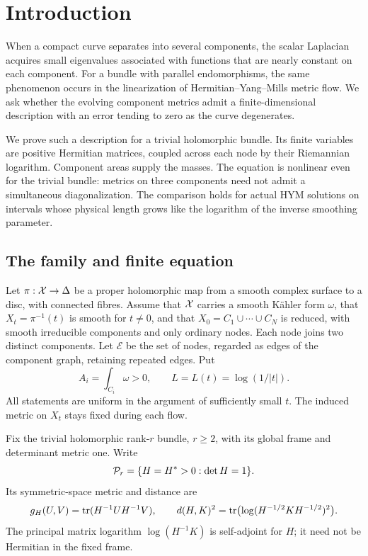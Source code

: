 \section{Introduction}\label{sec:intro}

When a compact curve separates into several components, the scalar
Laplacian acquires small eigenvalues associated with functions that are
nearly constant on each component. For a bundle with parallel
endomorphisms, the same phenomenon occurs in the linearization of
Hermitian--Yang--Mills metric flow. We ask whether the evolving component
metrics admit a finite-dimensional description with an error tending to
zero as the curve degenerates.

We prove such a description for a trivial holomorphic bundle. Its finite
variables are positive Hermitian matrices, coupled across each node by
their Riemannian logarithm. Component areas supply the masses. The
equation is nonlinear even for the trivial bundle: metrics on three
components need not admit a simultaneous diagonalization. The comparison
holds for actual HYM solutions on intervals whose physical length grows
like the logarithm of the inverse smoothing parameter.

\subsection{The family and finite equation}
Let $\pi:\mathcal X\to\Delta$ be a proper holomorphic map from a smooth complex
surface to a disc, with connected fibres. Assume that $\mathcal X$ carries a
smooth K\"ahler form $\omega$, that $X_t=\pi^{-1}(t)$ is smooth for
$t\ne0$, and that $X_0=C_1\cup\cdots\cup C_N$ is reduced, with smooth
irreducible components and only ordinary nodes. Each node joins two
distinct components. Let $\mathcal E$ be the set of nodes, regarded as
edges of the component graph, retaining repeated edges. Put
\[
 A_i=\int_{C_i}\omega>0,\qquad L=L(t)=\log(1/|t|).
\]
All statements are uniform in the argument of sufficiently small $t$.
The induced metric on $X_t$ stays fixed during each flow.

Fix the trivial holomorphic rank-$r$ bundle, $r\ge2$, with its global
frame and determinant metric one. Write
\[
 \mathcal P_r=\{H=H^*>0:\det H=1\}.
\]
Its symmetric-space metric and distance are
\begin{equation}\label{eq:target-metric}
 g_H(U,V)=\operatorname{tr}(H^{-1}UH^{-1}V),\qquad
 d(H,K)^2=\operatorname{tr}\bigl(\log(H^{-1/2}KH^{-1/2})^2\bigr).
\end{equation}
The principal matrix logarithm $\log(H^{-1}K)$ is self-adjoint for $H$;
it need not be Hermitian in the fixed frame.

